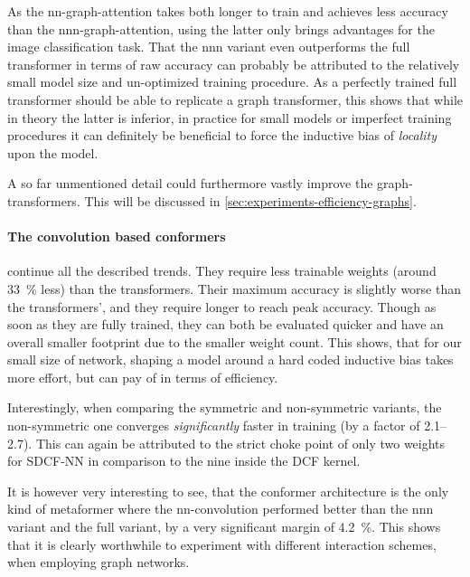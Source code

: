 As the nn-graph-attention takes both longer to train and achieves less accuracy than the nnn-graph-attention, using the latter only brings advantages for the image classification task.
That the nnn variant even outperforms the full transformer in terms of raw accuracy can probably be attributed to the relatively small model size and un-optimized training procedure.
As a perfectly trained full transformer should be able to replicate a graph transformer, this shows that while in theory the latter is inferior, in practice for small models or imperfect training procedures it can definitely be beneficial to force the inductive bias of \emph{locality} upon the model.

A so far unmentioned detail could furthermore vastly improve the graph-transformers. 
This will be discussed in \autoref{sec:experiments-efficiency-graphs}.

\paragraph{The convolution based conformers} continue all the described trends.
They require less trainable weights (around \SI[]{33}[]{\percent} less) than the transformers.
Their maximum accuracy is slightly worse than the transformers', and they require longer to reach peak accuracy.
Though as soon as they are fully trained, they can both be evaluated quicker and have an overall smaller footprint due to the smaller weight count.
This shows, that for our small size of network, shaping a model around a hard coded inductive bias takes more effort, but can pay of in terms of efficiency.

Interestingly, when comparing the symmetric and non-symmetric variants, the non-symmet\-ric one converges \emph{significantly} faster in training (by a factor of \SIrange[]{2.1}{2.7}{}). 
This can again be attributed to the strict choke point of only two weights for SDCF-NN in comparison to the nine inside the DCF kernel.

It is however very interesting to see, that the conformer architecture is the only kind of metaformer where the nn-convolution performed better than the nnn variant and the full variant, by a very significant margin of \SI[]{4.2}[]{\percent}.
This shows that it is clearly worthwhile to experiment with different interaction schemes, when employing graph networks.

